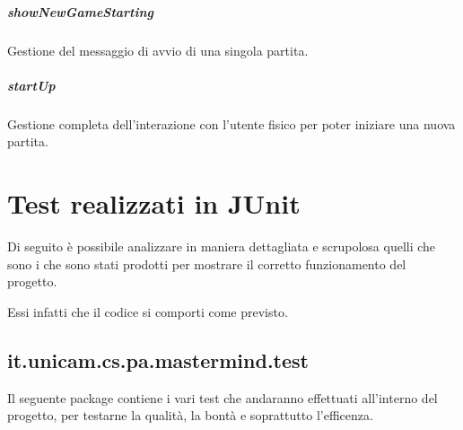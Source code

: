 \documentclass[letterpaper,10pt,italian]{sphinxmanual}
\begin{document}
\paragraph{showNewGameStarting}
\label{\detokenize{source/it/unicam/cs/pa/mastermind/ui/StartView:shownewgamestarting}}

\begin{fulllineitems}
\label{\detokenize{source/it/unicam/cs/pa/mastermind/ui/StartView:it.unicam.cs.pa.mastermind.ui.StartView.showNewGameStarting()}}
Gestione del messaggio di avvio di una singola partita.

\end{fulllineitems}



\paragraph{startUp}
\label{\detokenize{source/it/unicam/cs/pa/mastermind/ui/StartView:startup}}

\begin{fulllineitems}
\label{\detokenize{source/it/unicam/cs/pa/mastermind/ui/StartView:it.unicam.cs.pa.mastermind.ui.StartView.startUp()}}
Gestione completa dell’interazione con l’utente fisico per poter iniziare una nuova partita.

\end{fulllineitems}



\chapter{Test realizzati in JUnit}
\label{\detokenize{test/packages:test-realizzati-in-junit}}\label{\detokenize{test/packages::doc}}
Di seguito è possibile analizzare in maniera dettagliata e scrupolosa quelli che sono
i  che sono stati prodotti per mostrare il corretto funzionamento del progetto.

Essi infatti  che il codice si comporti come previsto.


\section{it.unicam.cs.pa.mastermind.test}
\label{\detokenize{test/it/unicam/cs/pa/mastermind/test/package-index:it-unicam-cs-pa-mastermind-test}}\label{\detokenize{test/it/unicam/cs/pa/mastermind/test/package-index::doc}}
Il seguente package contiene i vari test che andaranno effettuati all’interno del progetto, per testarne la qualità, la bontà e soprattutto l’efficenza.
\end{document}
